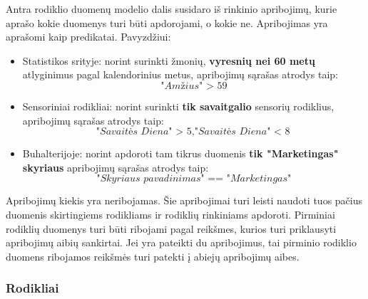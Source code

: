 \documentclass{VUMIFPSbakalaurinis}
\begin{document}
Antra rodiklio duomenų modelio dalis susidaro iš rinkinio apribojimų, kurie aprašo kokie duomenys turi būti apdorojami, o kokie ne. Apribojimas yra aprašomi kaip predikatai.
Pavyzdžiui:
\begin{itemize}
    \item Statistikos srityje: norint surinkti žmonių, \textbf{vyresnių nei 60 metų} atlyginimus pagal kalendorinius metus, apribojimų sąrašas atrodys taip: \[\textit{"Amžius" > 59}\]
    \item Sensoriniai rodikliai: norint surinkti \textbf{tik savaitgalio} sensorių rodiklius, apribojimų sąrašas atrodys taip: \[\textit{"Savaitės Diena" > 5}, \textit{"Savaitės Diena" < 8}\]
    \item Buhalterijoje: norint apdoroti tam tikrus duomenis \textbf{tik "Marketingas" skyriaus} apribojimų sąrašas atrodys taip: \[\textit{"Skyriaus pavadinimas" == "Marketingas"}\] 
\end{itemize}  
Apribojimų kiekis yra neribojamas. Šie apribojimai turi leisti naudoti tuos pačius duomenis skirtingiems rodikliams ir rodiklių rinkiniams apdoroti. Pirminiai rodiklių duomenys turi būti ribojami pagal reikšmes, kurios turi priklausyti apribojimų aibių sankirtai. Jei yra pateikti du apribojimus, tai pirminio rodiklio duomens ribojamos reikšmės turi patekti į abiejų apribojimų aibes. 
\par

\subsubsection{Rodikliai}
\end{document}
